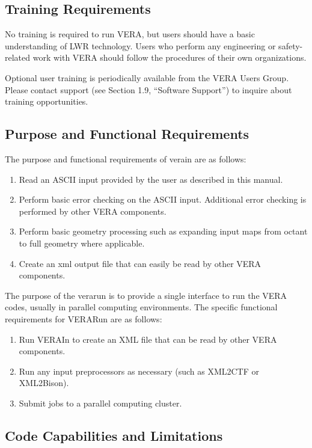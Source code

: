 \subsection{Training Requirements}

No training is required to run VERA, but users should have a basic understanding
of LWR technology. Users who perform any engineering or safety-related work with VERA should
follow the procedures of their own organizations.

Optional user training is periodically available from the VERA Users Group.
Please contact support (see Section 1.9, ``Software Support'') to inquire about training opportunities.

\subsection{Purpose and Functional Requirements}

The purpose and functional requirements of \ac{verain} are as follows:
\begin{enumerate}
\item Read an ASCII input provided by the user as described in this manual.
\item Perform basic error checking on the ASCII input. Additional error checking is performed by
other VERA components.
\item Perform basic geometry processing such as expanding input maps from octant to full geometry
where applicable.
\item Create an \ac{xml} output file that can easily be read by other VERA components.
\end{enumerate}

The purpose of the \ac{verarun} is to provide a single
interface to run the VERA codes, usually in parallel computing environments.
The specific functional requirements for VERARun are as follows:
\begin{enumerate}
\item Run VERAIn to create an XML file that can be read by other VERA components.
\item Run any input preprocessors as necessary (such as XML2CTF or XML2Bison).
\item Submit jobs to a parallel computing cluster.
\end{enumerate}


\subsection{Code Capabilities and Limitations}

